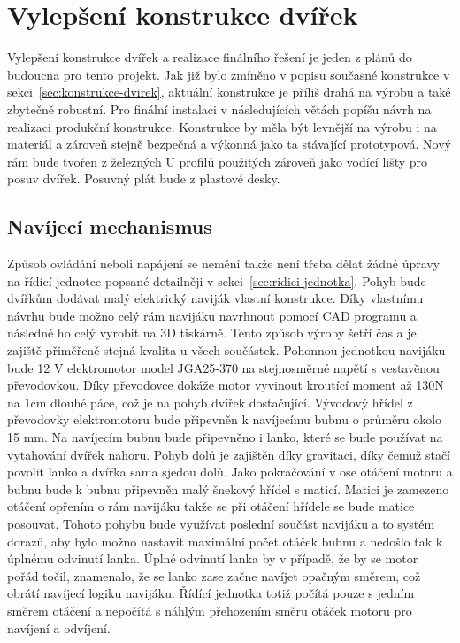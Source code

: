 \section{Vylepšení konstrukce dvířek}\label{sec:vylepseni-konstrukce-dvirek}
Vylepšení konstrukce dvířek a realizace finálního řešení je jeden z plánů do budoucna pro tento projekt.
Jak již bylo zmíněno v popisu současné konstrukce v sekci~\ref{sec:konstrukce-dvirek}, aktuální konstrukce je příliš drahá na výrobu a také zbytečně robustní.
Pro finální instalaci v následujících větách popíšu návrh na realizaci produkční konstrukce.\newline
Konstrukce by měla být levnější na výrobu i na materiál a zároveň stejně bezpečná a výkonná jako ta stávající prototypová.
Nový rám bude tvořen z železných U profilů použitých zároveň jako vodící lišty pro posuv dvířek.
Posuvný plát bude z plastové desky.

\subsection*{Navíjecí mechanismus}\label{subsec:navijeci-mechanismus}
Způsob ovládání neboli napájení se nemění takže není třeba dělat žádné úpravy na řídící jednotce popsané detailněji v sekci~\ref{sec:ridici-jednotka}.
Pohyb bude dvířkům dodávat malý elektrický naviják vlastní konstrukce.
Díky vlastnímu návrhu bude možno celý rám navijáku navrhnout pomocí CAD programu a následně ho celý vyrobit na 3D tiskárně.
Tento způsob výroby šetří čas a je zajiště přiměřeně stejná kvalita u všech součástek.
Pohonnou jednotkou navijáku bude 12 V elektromotor model JGA25-370 na stejnosměrné napětí s vestavěnou převodovkou.
Díky převodovce dokáže motor vyvinout kroutící moment až 130N na 1cm dlouhé páce, což je na pohyb dvířek dostačující.
Vývodový hřídel z převodovky elektromotoru bude připevněn k navíjecímu bubnu o průměru okolo 15 mm.
Na navíjecím bubnu bude připevněno i lanko, které se bude používat na vytahování dvířek nahoru.
Pohyb dolů je zajištěn díky gravitaci, díky čemuž stačí povolit lanko a dvířka sama sjedou dolů.
Jako pokračování v ose otáčení motoru a bubnu bude k bubnu připevněn malý šnekový hřídel s maticí.
Matici je zamezeno otáčení opřením o rám navijáku takže se při otáčení hřídele se bude matice posouvat.
Tohoto pohybu bude využívat poslední součást navijáku a to systém dorazů, aby bylo možno nastavit maximální počet otáček bubnu a nedošlo tak k úplnému odvinutí lanka.
Úplné odvinutí lanka by v případě, že by se motor pořád točil, znamenalo, že se lanko zase začne navíjet opačným směrem, což obrátí navíjecí logiku navijáku.
Řídící jednotka totiž počítá pouze s jedním směrem otáčení a nepočítá s náhlým přehozením směru otáček motoru pro navíjení a odvíjení.


